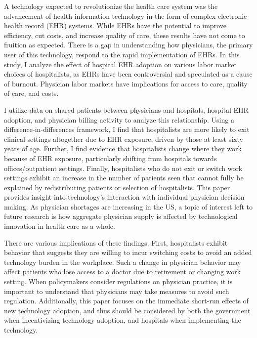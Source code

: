 \documentclass[12pt]{article}
\begin{document}
A technology expected to revolutionize the health care system was the advancement of health information technology in the form of complex electronic health record (EHR) systems. While EHRs have the potential to improve efficiency, cut costs, and increase quality of care, these results have not come to fruition as expected. There is a gap in understanding how physicians, the primary user of this technology, respond to the rapid implementation of EHRs. In this study, I analyze the effect of hospital EHR adoption on various labor market choices of hospitalists, as EHRs have been controversial and speculated as a cause of burnout. Physician labor markets have implications for access to care, quality of care, and costs. 

I utilize data on shared patients between physicians and hospitals, hospital EHR adoption, and physician billing activity to analyze this relationship. Using a difference-in-differences framework, I find that hospitalists are more likely to exit clinical settings altogether due to EHR exposure, driven by those at least sixty years of age. Further, I find evidence that hospitalists change where they work because of EHR exposure, particularly shifting from hospitals towards offices/outpatient settings. Finally, hospitalists who do not exit or switch work settings exhibit an increase in the number of patients seen that cannot fully be explained by redistributing patients or selection of hospitalists. This paper provides insight into technology's interaction with individual physician decision making. As physician shortages are increasing in the US, a topic of interest left to future research is how aggregate physician supply is affected by technological innovation in health care as a whole. 

There are various implications of these findings. First, hospitalists exhibit behavior that suggests they are willing to incur switching costs to avoid an added technology burden in the workplace. Such a change in physician behavior may affect patients who lose access to a doctor due to retirement or changing work setting. When policymakers consider regulations on physician practice, it is important to understand that physicians may take measures to avoid such regulation. Additionally, this paper focuses on the immediate short-run effects of new technology adoption, and thus should be considered by both the government when incentivizing technology adoption, and hospitals when implementing the technology. 
 
\end{document}
